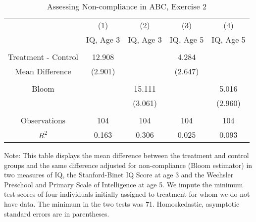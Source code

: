 \begin{table}[H] 
\begin{threeparttable}
\caption{Assessing Non-compliance in ABC, Exercise 2}
\label{table:nc2}
\centering 
\begin{tabular}{ccccc} \toprule
 & (1) & (2) & (3) & (4) \\
 & IQ, Age 3 & IQ, Age 3  & IQ, Age 5 & IQ, Age 5 \\ \midrule
 &  &  & & \\
Treatment - Control & 12.908 &  & 4.284 &  \\
 Mean Difference & (2.901) &  & (2.647) &  \\
  &  &  & & \\
Bloom &  & 15.111 &  & 5.016 \\
 &  & (3.061) &  & (2.960) \\ \\ \midrule
Observations & 104 & 104 & 104 & 104 \\
 $R^2$ & 0.163 & 0.306 & 0.025 & 0.093 \\ \bottomrule
 \end{tabular}
\begin{tablenotes}
\footnotesize
\item Note: This table displays the mean difference between the treatment and control groups and the same difference adjusted for non-compliance (Bloom estimator) in two measures of IQ, the Stanford-Binet IQ Score at age 3 and the Wechsler Preschool and Primary Scale of Intelligence at age 5. We impute the minimum test scores of four individuals initially assigned to treatment for whom we do not have data. The minimum in the two tests was 71. Homoskedastic, asymptotic standard errors are in parentheses.
\end{tablenotes}
\end{threeparttable}
\end{table}


